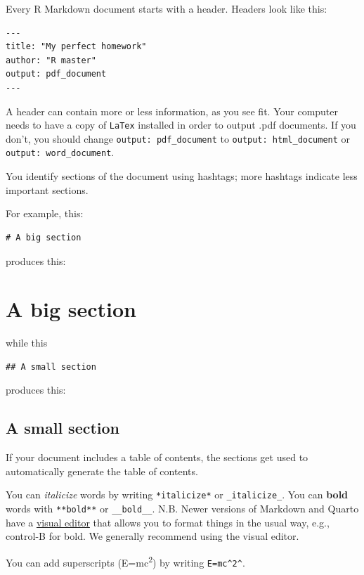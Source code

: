 \documentclass[
  letterpaper,
  DIV=11,
  numbers=noendperiod]{scrreprt}
\begin{document}
Every R Markdown document starts with a header. Headers look like this:

\begin{verbatim}
---
title: "My perfect homework"
author: "R master"
output: pdf_document
---
\end{verbatim}

A header can contain more or less information, as you see fit. Your
computer needs to have a copy of \texttt{LaTex} installed in order to
output .pdf documents. If you don't, you should change
\texttt{output:\ pdf\_document} to \texttt{output:\ html\_document} or
\texttt{output:\ word\_document}.

You identify sections of the document using hashtags; more hashtags
indicate less important sections.

For example, this:

\begin{verbatim}
# A big section
\end{verbatim}

produces this:

\hypertarget{a-big-section}{%
\chapter{A big section}\label{a-big-section}}

while this

\begin{verbatim}
## A small section
\end{verbatim}

produces this:

\hypertarget{a-small-section}{%
\section{A small section}\label{a-small-section}}

If your document includes a table of contents, the sections get used to
automatically generate the table of contents.

You can \emph{italicize} words by writing \texttt{*italicize*} or
\texttt{\_italicize\_}. You can \textbf{bold} words with
\texttt{**bold**} or \texttt{\_\_bold\_\_}. N.B. Newer versions of
Markdown and Quarto have a
\href{https://rstudio.github.io/visual-markdown-editing/}{visual editor}
that allows you to format things in the usual way, e.g., control-B for
bold. We generally recommend using the visual editor.

You can add superscripts (E=mc\textsuperscript{2}) by writing
\texttt{E=mc\^{}2\^{}}.
\end{document}
